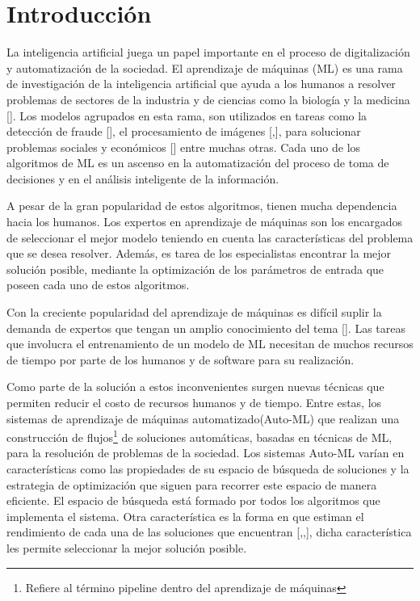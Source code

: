 \chapter*{Introducción}\label{chapter:introduction}
La inteligencia artificial juega un papel importante en el proceso de digitalización y automatización de la sociedad. El aprendizaje de máquinas (ML) es una rama de 
investigación de la inteligencia artificial que ayuda a los humanos a resolver problemas de sectores de la industria y de ciencias como la biología y la medicina 
[\cite{39}]. Los modelos agrupados en esta rama, son utilizados en tareas como la detección de fraude [\cite{4}], el procesamiento de imágenes [\cite{1},\cite{3}], 
para solucionar problemas sociales y económicos [\cite{2}] entre muchas otras. Cada uno de los algoritmos de ML es un ascenso en la automatización del proceso de 
toma de decisiones y en el análisis inteligente de la información. 

A pesar de la gran popularidad de estos algoritmos, tienen mucha dependencia hacia los humanos. Los expertos en aprendizaje de máquinas son los encargados 
de seleccionar el mejor modelo teniendo en cuenta las características del problema que se desea resolver. Además, es tarea de los especialistas encontrar 
la mejor solución posible, mediante la optimización de los parámetros de entrada que poseen cada uno de estos algoritmos. 

Con la creciente popularidad del aprendizaje de máquinas es difícil suplir la demanda de expertos que tengan un amplio conocimiento del tema [\cite{33}]. 
Las tareas que involucra el entrenamiento de un modelo de ML necesitan de muchos recursos de tiempo por parte de los humanos y de software para su realización.

Como parte de la solución a estos inconvenientes surgen nuevas técnicas que permiten reducir el costo de recursos humanos y de tiempo. Entre estas,
los sistemas de aprendizaje de máquinas automatizado(Auto-ML) que realizan una construcción de flujos\footnote{Refiere al término pipeline dentro del aprendizaje de 
máquinas} de soluciones automáticas, basadas en técnicas de ML,  
para la resolución de problemas de la sociedad. Los sistemas Auto-ML varían en características como las propiedades de su espacio de búsqueda de soluciones y la 
estrategia de optimización que siguen para recorrer este espacio de manera eficiente. El espacio de búsqueda está formado por todos los algoritmos que 
implementa el sistema. Otra característica es la forma en que estiman el rendimiento de cada una de las soluciones que encuentran [\cite{33},\cite{37},\cite{52}], dicha 
característica les permite seleccionar la mejor solución posible.

